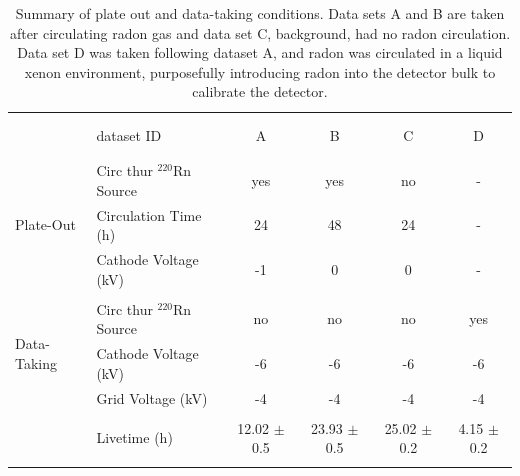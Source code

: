 \begin{table}[ht]
\centering
\begin{tabular}{llcccc}
\hline
\\[-5pt]
\\[-5pt]
& dataset ID & A &B & C & D \\
\\[-5pt]
\hline
\\[-5pt]

\multirow{3}{*}{Plate-Out} & Circ thur $^{220}$Rn Source & yes & yes & no & - \\
& Circulation Time (h) & 24 & 48 & 24 & - \\
& Cathode Voltage (kV) & -1 & 0 & 0 &  - \\
\\[-5pt]

\multirow{3}{*}{Data-Taking} & Circ thur $^{220}$Rn Source & no & no & no & yes\\
& Cathode Voltage (kV) & -6 & -6 & -6 & -6 \\
& Grid Voltage (kV) & -4 & -4 & -4 & -4 \\

\\[-5pt]
& Livetime (h) & 12.02 $\pm$ 0.5 & 23.93 $\pm$ 0.5 & 25.02 $\pm$ 0.2 & 4.15 $\pm$ 0.2  \\

\\[-5pt]
\hline
\end{tabular}
\caption{Summary of plate out and data-taking conditions. Data sets A and B are taken after circulating radon gas and data set C, background, had no radon circulation. Data set D was taken following dataset A, and radon was circulated in a liquid xenon environment, purposefully introducing radon into the detector bulk to calibrate the detector.}
\label{T:1}
\end{table}



